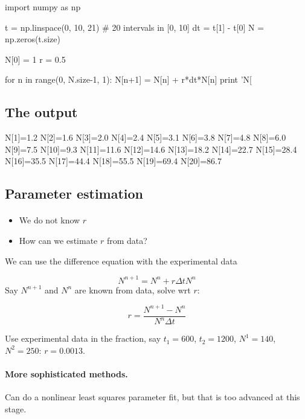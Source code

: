 \documentclass[%
twoside,                 %
final,                   %
10pt]{article}
\begin{document}
\bpypro
import numpy as np

t = np.linspace(0, 10, 21)  # 20 intervals in [0, 10]
dt = t[1] - t[0]
N = np.zeros(t.size)

N[0] = 1
r = 0.5

for n in range(0, N.size-1, 1):
    N[n+1] = N[n] + r*dt*N[n]
    print 'N[%
\epypro



\subsection{The output}

\bccq
N[1]=1.2
N[2]=1.6
N[3]=2.0
N[4]=2.4
N[5]=3.1
N[6]=3.8
N[7]=4.8
N[8]=6.0
N[9]=7.5
N[10]=9.3
N[11]=11.6
N[12]=14.6
N[13]=18.2
N[14]=22.7
N[15]=28.4
N[16]=35.5
N[17]=44.4
N[18]=55.5
N[19]=69.4
N[20]=86.7
\eccq

\subsection{Parameter estimation}


\paragraph{}
\begin{itemize}
 \item We do not know $r$

 \item How can we estimate $r$ from data?
\end{itemize}

\noindent
We can use the difference equation with the experimental data

\[ N^{n+1} = N^n + r\Delta t N^n\]
Say $N^{n+1}$ and $N^n$ are known from data, solve wrt $r$:

\[ r = \frac{N^{n+1}-N^n}{N^n\Delta t} \]

Use experimental data in the fraction, say $t_1=600$, $t_2=1200$,
$N^1=140$, $N^2=250$: $r=0.0013$.




\paragraph{More sophisticated methods.}
Can do a nonlinear least squares parameter fit, but that is
too advanced at this stage.
\end{document}
